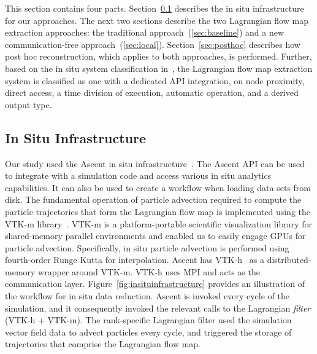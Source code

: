 This section contains four parts.
%
Section~\ref{sec:insituinfrastructure} describes the in situ infrastructure for our approaches.
%
The next two sections describe the two Lagrangian flow map extraction approaches:
the traditional approach~(\ref{sec:baseline}) and a new communication-free approach~(\ref{sec:local}).
%
Section~\ref{sec:posthoc} describes how post hoc reconstruction, which applies to both approaches, is performed.
%
%
Further, based on the in situ system classification in~\cite{childs2020istp}, the Lagrangian flow map extraction system is classified as one with a dedicated API integration, on node proximity, direct access, a time division of execution, automatic operation, and a derived output type.

\subsection{In Situ Infrastructure}
\label{sec:insituinfrastructure}
Our study used the Ascent in situ infrastructure~\cite{Larsen2017Ascent}.
%
The Ascent API can be used to integrate with a simulation code and access various in situ analytics capabilities.
%
It can also be used to create a workflow when loading data sets from disk.
%
The fundamental operation of particle advection required to compute the particle trajectories that form the Lagrangian flow map is implemented using the VTK-m library~\cite{moreland2016vtk}.
%
VTK-m is a platform-portable scientific visualization library for shared-memory parallel environments and enabled us to easily engage GPUs for particle advection.
%
Specifically, in situ particle advection is performed using fourth-order Runge Kutta for interpolation.
%
Ascent has VTK-h~\cite{Larsen2017Ascent} as a distributed-memory wrapper around VTK-m.
%
VTK-h uses MPI and acts as the communication layer.
%
Figure~\ref{fig:insituinfrastructure} provides an illustration of the workflow for in situ data reduction.
%
Ascent is invoked every cycle of the simulation, and it consequently invoked the relevant calls to the Lagrangian \textit{filter} (VTK-h + VTK-m).
%
The rank-specific Lagrangian filter used the simulation vector field data to advect particles every cycle, and triggered the storage of trajectories that comprise the Lagrangian flow map. 
%



